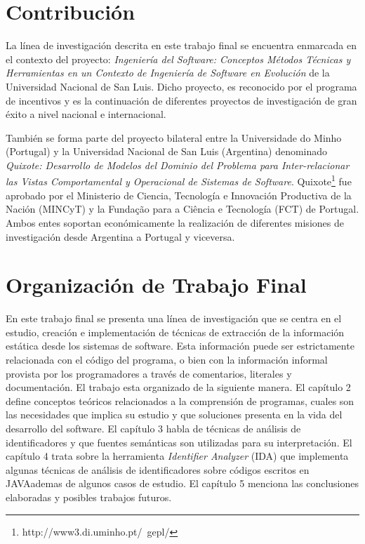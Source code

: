 \documentclass[12pt]{report}
\begin{document}

\section{Contribución}
La línea de investigación descrita en este trabajo final se encuentra enmarcada en el 
contexto del proyecto: \textit{Ingeniería del Software: Conceptos Métodos Técnicas y 
Herramientas en un Contexto de Ingeniería de Software en Evolución} de la Universidad 
Nacional de San Luis. 
Dicho proyecto, es reconocido por el programa de incentivos y es la continuación de 
diferentes proyectos de investigación de gran éxito a nivel nacional e internacional.

También se forma parte del proyecto bilateral entre la Universidade do Minho (Portugal)
 y la Universidad Nacional de San Luis (Argentina) denominado \textit{Quixote: Desarrollo de 
Modelos del Dominio del Problema para Inter-relacionar las Vistas Comportamental y 
Operacional de Sistemas de Software}. Quixote\footnote[2]{http://www3.di.uminho.pt/~gepl/} fue aprobado por el 
Ministerio de Ciencia, Tecnología e Innovación Productiva de la Nación 
(MINCyT) y la Fundação para a Ciência e Tecnología (FCT) de Portugal. 
Ambos entes soportan económicamente la realización de diferentes misiones de investigación desde Argentina a Portugal y viceversa.

\section{Organización de Trabajo Final}
En este trabajo final se presenta una línea de investigación que se centra en el estudio, creación e implementación de técnicas de extracción de la información estática desde los sistemas de software. 
Esta información puede ser estrictamente relacionada con el código del programa, o bien con la información informal provista por los programadores a través de comentarios, literales y documentación. El trabajo esta organizado de la siguiente manera. El capítulo 2 define conceptos teóricos relacionados a la comprensión de programas, cuales son las necesidades que implica su estudio y que soluciones presenta en la vida del desarrollo del software. El capítulo 3 habla de técnicas de análisis de identificadores y que fuentes semánticas son utilizadas para su interpretación. El capítulo 4 trata sobre la herramienta \textit{Identifier Analyzer} (IDA) que implementa algunas técnicas de análisis de identificadores sobre códigos escritos en JAVA\texttrademark ademas de algunos casos de estudio. El capítulo 5 menciona las conclusiones elaboradas y posibles trabajos futuros.
\end{document}
